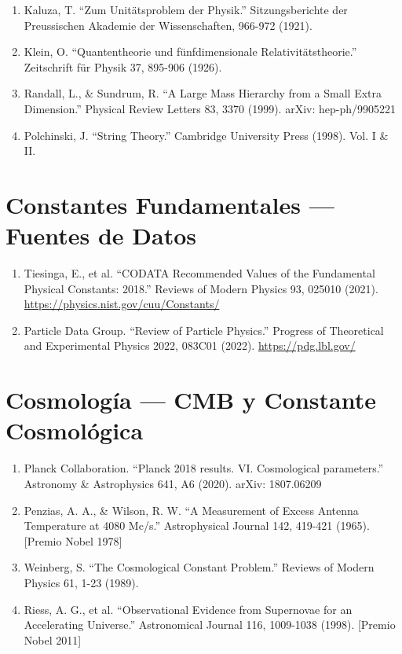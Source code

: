 \begin{enumerate}
    \item Kaluza, T. ``Zum Unitätsproblem der Physik.'' Sitzungsberichte der Preussischen Akademie der Wissenschaften, 966-972 (1921).

    \item Klein, O. ``Quantentheorie und fünfdimensionale Relativitätstheorie.'' Zeitschrift für Physik 37, 895-906 (1926).

    \item Randall, L., \& Sundrum, R. ``A Large Mass Hierarchy from a Small Extra Dimension.'' Physical Review Letters 83, 3370 (1999). arXiv: hep-ph/9905221

    \item Polchinski, J. ``String Theory.'' Cambridge University Press (1998). Vol. I \& II.
\end{enumerate}


\section{Constantes Fundamentales --- Fuentes de Datos}

\begin{enumerate}
    \item Tiesinga, E., et al. ``CODATA Recommended Values of the Fundamental Physical Constants: 2018.'' Reviews of Modern Physics 93, 025010 (2021). \url{https://physics.nist.gov/cuu/Constants/}

    \item Particle Data Group. ``Review of Particle Physics.'' Progress of Theoretical and Experimental Physics 2022, 083C01 (2022). \url{https://pdg.lbl.gov/}
\end{enumerate}


\section{Cosmología --- CMB y Constante Cosmológica}

\begin{enumerate}
    \item Planck Collaboration. ``Planck 2018 results. VI. Cosmological parameters.'' Astronomy \& Astrophysics 641, A6 (2020). arXiv: 1807.06209

    \item Penzias, A. A., \& Wilson, R. W. ``A Measurement of Excess Antenna Temperature at 4080 Mc/s.'' Astrophysical Journal 142, 419-421 (1965). [Premio Nobel 1978]

    \item Weinberg, S. ``The Cosmological Constant Problem.'' Reviews of Modern Physics 61, 1-23 (1989).

    \item Riess, A. G., et al. ``Observational Evidence from Supernovae for an Accelerating Universe.'' Astronomical Journal 116, 1009-1038 (1998). [Premio Nobel 2011]
\end{enumerate}


